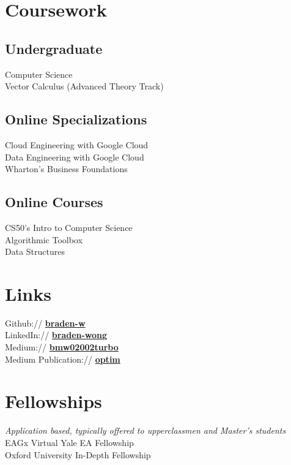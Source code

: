 \documentclass[]{deedy-resume-openfont}
\begin{document}
\begin{minipage}[t]{0.3\textwidth}

\section{Coursework}
\subsection{Undergraduate}
Computer Science \\
Vector Calculus (Advanced Theory Track) \\
\sectionsep
\subsection{Online Specializations}
Cloud Engineering with Google Cloud\\
Data Engineering with Google Cloud\\
Wharton's Business Foundations\\
\sectionsep
\subsection{Online Courses}
CS50's Intro to Computer Science \\
Algorithmic Toolbox \\
Data Structures \\



\section{Links} 
Github:// \href{https://github.com/braden-w}{\bf braden-w} \\
LinkedIn://  \href{https://www.linkedin.com/in/braden-wong/}{\bf braden-wong} \\
Medium://  \href{medium.com/@bmw02002turbo}{\bf bmw02002turbo} \\
Medium Publication://  \href{medium.com/optim}{\bf optim}


\section{Fellowships}
\textit{Application based, typically offered to upperclassmen and Master's students} \\
EAGx Virtual \textbullet{} Yale EA Fellowship \\
Oxford University In-Depth Fellowship


\end{minipage}
\end{document}
